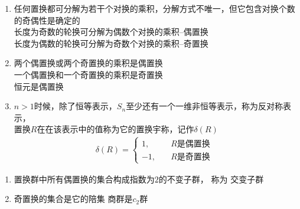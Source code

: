 \begin{newlemma}[置换群元的奇偶性]
	\begin{enumerate}
		\item 
		任何置换都可分解为若干个对换的乘积，分解方式不唯一，但它包含对换个数的奇偶性是确定的\\
		长度为{\color{seco}奇数}的轮换可分解为{\color{seco}偶数}个对换的乘积--{\color{seco}偶置换}\\
		长度为{\color{seco}偶数}的轮换可分解为{\color{seco}奇数}个对换的乘积--{\color{seco}奇置换}
		\item 
		两个{\color{seco}偶置换}或两个{\color{seco}奇置换}的乘积是{\color{seco}偶置换}\\
		一个{\color{seco}偶置换}和一个{\color{seco}奇置换}的乘积是{\color{seco}奇置换}\\
		恒元是偶置换
		\item 
		$n>1$时候，除了恒等表示，$S_n$至少还有一个一维非恒等表示，称为反对称表示，\\
		置换$R$在在该表示中的值称为它的{\color{seco}置换宇称}，记作$\delta(R)$
		\begin{equation}\begin{aligned}
			\delta(R)=
			\begin{cases}
			{1},\quad &\text{$R$是偶置换 } \\
			{-1},\quad &\text{$R$是奇置换}
			\end{cases}
		\end{aligned}\end{equation}
	\end{enumerate}
\end{newlemma}


\begin{newdef}[交变子群]
	\begin{enumerate}
	\item 
	置换群中所有偶置换的集合构成指数为$2$的不变子群，
	称为{\color{seco} 交变子群 }
	\item
	奇置换的集合是它的陪集
	商群是$c_2$群
	\end{enumerate}
\end{newdef}


